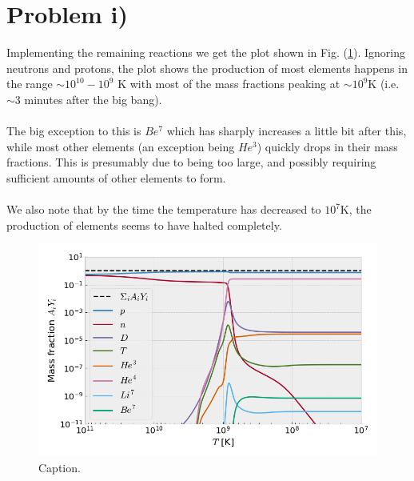 \documentclass[reprint,english,notitlepage]{revtex4-1}  %
\numberwithin{equation}{section}
\begin{document}
\section{Problem i)}
Implementing the remaining reactions we get the plot shown in Fig.
(\ref{fig:problem_i}). Ignoring neutrons and protons, the plot shows the
production of most elements happens in the range $\sim 10^{10} - 10^9$ K with
most of the mass fractions peaking at $\sim 10^{9}$K (i.e. $\sim 3$ minutes
after the big bang).
\\ \\
The big exception to this is $Be^7$ which has sharply increases a little bit after
this, while most other elements (an exception being $He^3$) quickly drops in their
mass fractions. This is presumably due to being too large, and possibly requiring
sufficient amounts of other elements to form.
\\ \\
We also note that by the time the temperature has decreased to $10^7$K, the
production of elements seems to have halted completely.
\begin{figure}[h]
	\includegraphics[width=\columnwidth]{densities_i.png}
	\caption{Caption.}
	\label{fig:problem_i}
\end{figure}
\end{document}
